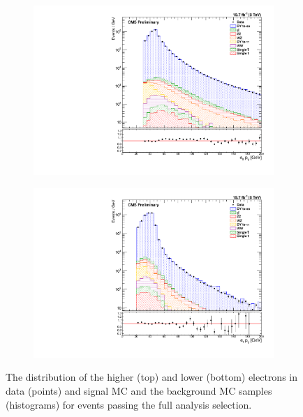 \begin{figure}[!htbp]
    \centering
    \begin{subfigure}[b]{0.65\textwidth}
        \includegraphics[width=\textwidth]{figures/e0_pt.pdf}
        \caption{}
        \label{fig:e_pt_high}
    \end{subfigure}
    \begin{subfigure}[b]{0.65\textwidth}
        \includegraphics[width=\textwidth]{figures/e1_pt.pdf}
        \caption{}
        \label{fig:e_pt_low}
    \end{subfigure}
    \caption[
        The \pt distribution of electrons in data.
    ]{
        The \pt distribution of the higher (top) and lower (bottom) \pt
        electrons in data (points) and \MADGRAPH signal MC and the background
        MC samples (histograms) for events passing the full analysis selection.
    }
    \label{fig:e_pt}
\end{figure}

